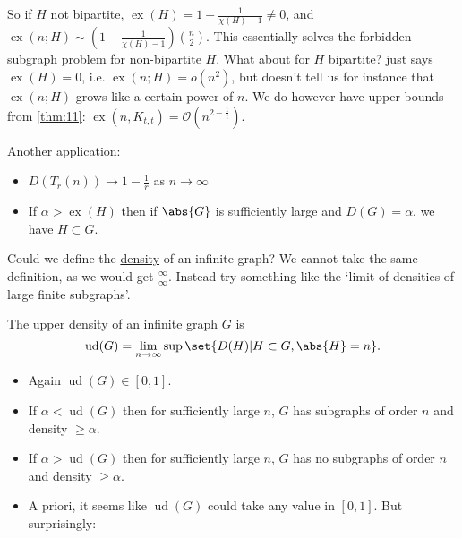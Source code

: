 \documentclass{article}
\DeclareMathOperator{\ext}{ex}
\DeclareMathOperator{\ud}{ud}
\begin{document}
So if $H$ not bipartite, $\ext(H) = 1 - \frac{1}{\chi(H) - 1} \neq 0$, and $\ext(n; H) \sim (1 - \frac{1}{\chi(H) - 1}) \binom{n}{2}$.
This essentially solves the forbidden subgraph problem for non-bipartite $H$.
What about for $H$ bipartite?
 just says $\ext(H) = 0$, i.e. $\ext(n; H) = o(n^2)$, but doesn't tell us for instance that $\ext(n; H)$ grows like a certain power of $n$.
We do however have upper bounds from \cref{thm:11}: $\ext(n, K_{t, t}) = \mathcal{O}(n^{2 - \frac{1}{t}})$.

Another application:

\begin{eg}
    \leavevmode
    \begin{itemize}
        \item $D(T_r(n)) \to 1 - \frac{1}{r}$ as $n \to \infty$
        \item If $\alpha > \ext(H)$ then if $\abs{G}$ is sufficiently large and $D(G) = \alpha$, we have $H \subset G$.
    \end{itemize}
\end{eg}

Could we define the \hyperlink{def:density}{density} of an infinite graph?
We cannot take the same definition, as we would get $\frac{\infty}{\infty}$.
Instead try something like the `limit of densities of large finite subgraphs'.

\begin{defi}
    The upper density of an infinite graph $G$ is
    \begin{equation*}
        \ud(G) = \lim_{n \to \infty} \sup\set{D(H) | H \subset G, \abs{H} = n}.
    \end{equation*}
\end{defi}

\begin{remark}
    \leavevmode
    \begin{itemize}
        \item Again $\ud(G) \in [0, 1]$.
        \item If $\alpha < \ud(G)$ then for sufficiently large $n$, $G$ has subgraphs of order $n$ and density $\geq \alpha$.
        \item If $\alpha > \ud(G)$ then for sufficiently large $n$, $G$ has no subgraphs of order $n$ and density $\geq \alpha$.
        \item A priori, it seems like $\ud(G)$ could take any value in $[0, 1]$. But surprisingly:
    \end{itemize}
\end{remark}
\end{document}

